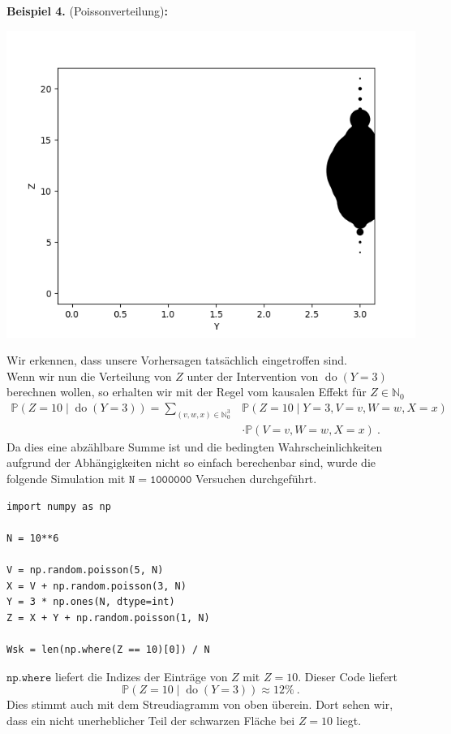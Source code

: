 \documentclass[headsepline,11pt,bibliography=leveldown]{scrbook}
\newcounter{NewZaehler}
\newcommand{\NewZahl}{\refstepcounter{NewZaehler}4.\theNewZaehler}
\newenvironment{NewBeispiel}[1]{\par\medskip\textbf{Beispiel \NewZahl} #1\textbf{:}\\}{\par\medskip}
\newcommand{\Do}{\operatorname{do}}
\begin{document}
\begin{NewBeispiel}{(Poissonverteilung)}
\begin{minipage}{0.333\linewidth}
\begin{center}
	\includegraphics[width=1.1\linewidth]{Y_Z_Poiss_Post}
\end{center}
\vspace*{0\baselineskip}
\end{minipage}

Wir erkennen, dass unsere Vorhersagen tatsächlich eingetroffen sind.\\

Wenn wir nun die Verteilung von $Z$ unter der Intervention von $\Do(Y = 3)$ berechnen wollen, so erhalten wir mit der Regel vom kausalen Effekt für $Z \in \mathbb{N}_0$
\begin{align*}
\mathbb{P}(Z = 10 \mid \Do(Y = 3)) = \sum_{(v, w, x) \in \mathbb{N}_0^3}& \mathbb{P}(Z = 10 \mid Y = 3, V = v, W = w, X = x)\\
&\cdot \mathbb{P}(V = v, W = w, X = x)~.
\end{align*}
Da dies eine abzählbare Summe ist und die bedingten Wahrscheinlichkeiten aufgrund der Abhängigkeiten nicht so einfach berechenbar sind, wurde die folgende Simulation mit $\mathtt{N = 1000000}$ Versuchen durchgeführt.

\begin{lstlisting}
import numpy as np

N = 10**6

V = np.random.poisson(5, N)
X = V + np.random.poisson(3, N)
Y = 3 * np.ones(N, dtype=int)
Z = X + Y + np.random.poisson(1, N)

Wsk = len(np.where(Z == 10)[0]) / N
\end{lstlisting}

$\mathtt{np.where}$ liefert die Indizes der Einträge von $Z$ mit $Z = 10$. Dieser Code liefert
\[\mathbb{P}(Z = 10 \mid \Do(Y = 3)) \approx 12 \%~.\]
Dies stimmt auch mit dem Streudiagramm von oben überein. Dort sehen wir, dass ein nicht unerheblicher Teil der schwarzen Fläche bei $Z = 10$ liegt.
\end{NewBeispiel}
\end{document}
